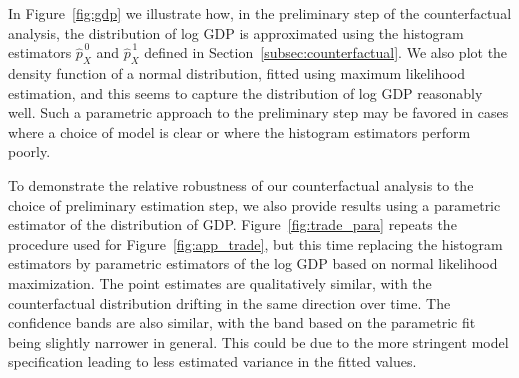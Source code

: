 In Figure~\ref{fig:gdp} we illustrate how, in the preliminary
step of the counterfactual analysis, the distribution of
log GDP is approximated using the histogram estimators
$\hat p_X^{\,0}$ and $\hat p_X^{\,1}$
defined in Section~\ref{subsec:counterfactual}.
We also plot the density function of a normal distribution,
fitted using maximum likelihood estimation,
and this seems to capture the distribution of log GDP reasonably well.
Such a parametric approach to the preliminary step
may be favored in cases where a choice of model
is clear or where the histogram estimators perform poorly.

To demonstrate the relative robustness
of our counterfactual analysis to the choice of preliminary
estimation step, we also provide results using a parametric
estimator of the distribution of GDP.
Figure~\ref{fig:trade_para} repeats the procedure used for
Figure~\ref{fig:app_trade}, but this time
replacing the histogram estimators by parametric estimators of the log GDP
based on normal likelihood maximization.
The point estimates are qualitatively similar, with the counterfactual
distribution drifting in the same direction over time.
The confidence bands are also similar, with the band based on the
parametric fit being slightly narrower in general.
This could be due to the more stringent model specification
leading to less estimated variance in the fitted values.

